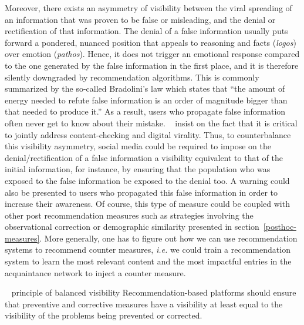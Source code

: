 \documentclass[10pt]{article}
\begin{document}
Moreover, there exists an asymmetry of visibility between the viral spreading of an information that was proven to be false or misleading, and the denial or rectification of that information.
The denial of a false information usually puts forward a pondered, nuanced position that appeals to reasoning and facts (\textit{logos}) over emotion (\textit{pathos}). Hence, it does not trigger an emotional response compared to the one generated by the false information in the first place, and it is therefore silently downgraded by recommendation algorithms. This is commonly summarized by the so-called Bradolini's law which states  that ``the amount of energy needed to refute false information is an order of magnitude bigger than that needed to produce it.''
As a result, users who propagate false information often never get to know about their mistake.
~\cite{venturini2019fake} insist on the fact that it is critical to jointly address content-checking and digital virality. Thus, to counterbalance this visibility asymmetry, social media could be required to impose on the denial/rectification of a false information a visibility equivalent to that of the initial information, for instance, by ensuring that the population who was exposed to the false information be exposed to the denial too.
A warning could also be presented to users who propagated this false information in order to increase their awareness.
Of course, this type of measure could be coupled with other post recommendation measures such as strategies involving the observational correction or demographic similarity presented in section~\ref{posthoc-measures}.
More generally, one has to figure out how we can use recommendation systems to recommend counter measures, \textit{i.e.} we could train a recommendation system to learn the most relevant content and the most impactful entries in the acquaintance network to inject a counter measure.

\begin{principle}{\faThumbTack ~ principle of balanced visibility}
Recommendation-based platforms should ensure that preventive and corrective measures have a visibility at least equal to the visibility of the problems being prevented or corrected.
\end{principle}


\end{document}

